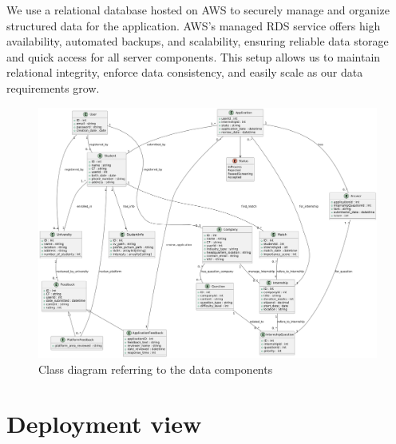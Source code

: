 We use a relational database hosted on AWS to securely manage and organize structured data for the application. AWS’s managed RDS service offers high availability, automated backups, and scalability, ensuring reliable data storage and quick access for all server components. This setup allows us to maintain relational integrity, enforce data consistency, and easily scale as our data requirements grow.


\begin{figure}[!ht]
    \centering
    \includegraphics[scale=0.30]{Images/ImagesDD/class_diagram.png}
    \caption{Class diagram referring to the data components}
\end{figure}


\section{Deployment view}

